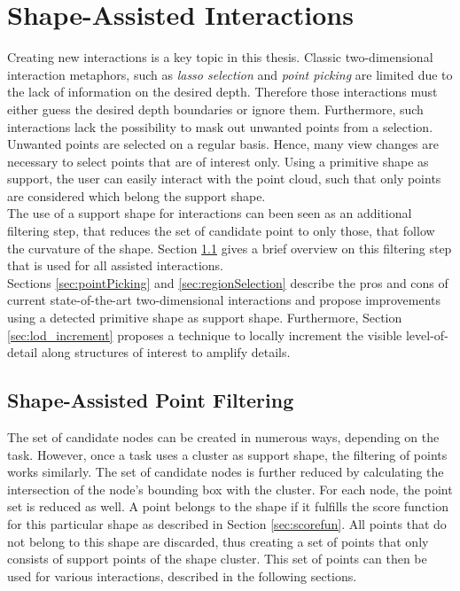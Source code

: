 \section{Shape-Assisted Interactions}
\label{sec:interactions}

Creating new interactions is a key topic in this thesis. Classic two-dimensional interaction metaphors, such as \textit{lasso selection} and \textit{point picking} are limited due to the lack of information on the desired depth. Therefore those interactions must either guess the desired depth boundaries or ignore them. Furthermore, such interactions lack the possibility to mask out unwanted points from a selection. Unwanted points are selected on a regular basis. Hence, many view changes are necessary to select points that are of interest only. Using a primitive shape as support, the user can easily interact with the point cloud, such that only points are considered which belong the support shape. 
\\
The use of a support shape for interactions can been seen as an additional filtering step, that reduces the set of candidate point to only those, that follow the curvature of the shape. Section \ref{sec:pointFiltering} gives a brief overview on this filtering step that is used for all assisted interactions. 
\\
Sections \ref{sec:pointPicking} and \ref{sec:regionSelection} describe the pros and cons of current state-of-the-art two-dimensional interactions and propose improvements using a detected primitive shape as support shape. Furthermore, Section \ref{sec:lod_increment} proposes a technique to locally increment the visible level-of-detail along structures of interest to amplify details. 


\subsection{Shape-Assisted Point Filtering}
\label{sec:pointFiltering}

The set of candidate nodes can be created in numerous ways, depending on the task. However, once a task uses a cluster as support shape, the filtering of points works similarly. The set of candidate nodes is further reduced by calculating the intersection of the node's bounding box with the cluster. For each node, the point set is reduced as well. A point belongs to the shape if it fulfills the score function for this particular shape as described in Section \ref{sec:scorefun}. All points that do not belong to this shape are discarded, thus creating a set of points that only consists of support points of the shape cluster. This set of points can then be used for various interactions, described in the following sections. 


